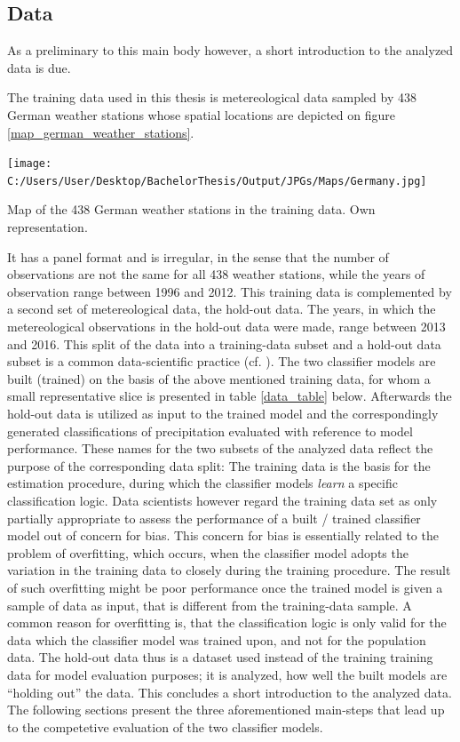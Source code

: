 \documentclass[
  12pt,
]{article}
\begin{document}
\pagebreak

\hypertarget{data}{%
\subsection{Data}\label{data}}

As a preliminary to this main body however, a short introduction to the
analyzed data is due.

The training data used in this thesis is metereological data sampled by
438 German weather stations whose spatial locations are depicted on
figure \ref{map_german_weather_stations}.

\begin{floatingfigure}[r]{7cm}
  \texttt{[image: C:/Users/User/Desktop/BachelorThesis/Output/JPGs/Maps/Germany.jpg]}
  \caption{Map of the 438 German weather stations in the training data. Own representation.}
  \label{map_german_weather_stations}
\end{floatingfigure}

It has a panel format and is irregular, in the sense that the number of
observations are not the same for all 438 weather stations, while the
years of observation range between 1996 and 2012. This training data is
complemented by a second set of metereological data, the hold-out data.
The years, in which the metereological observations in the hold-out data
were made, range between 2013 and 2016. This split of the data into a
training-data subset and a hold-out data subset is a common
data-scientific practice (cf. \citet{Zumel.2014}). The two classifier
models are built (trained) on the basis of the above mentioned training
data, for whom a small representative slice is presented in table
\ref{data_table} below. Afterwards the hold-out data is utilized as
input to the trained model and the correspondingly generated
classifications of precipitation evaluated with reference to model
performance. These names for the two subsets of the analyzed data
reflect the purpose of the corresponding data split: The training data
is the basis for the estimation procedure, during which the classifier
models \textit{learn} a specific classification logic. Data scientists
however regard the training data set as only partially appropriate to
assess the performance of a built / trained classifier model out of
concern for bias. This concern for bias is essentially related to the
problem of overfitting, which occurs, when the classifier model adopts
the variation in the training data to closely during the training
procedure. The result of such overfitting might be poor performance once
the trained model is given a sample of data as input, that is different
from the training-data sample. A common reason for overfitting is, that
the classification logic is only valid for the data which the classifier
model was trained upon, and not for the population data. The hold-out
data thus is a dataset used instead of the training training data for
model evaluation purposes; it is analyzed, how well the built models are
``holding out'' the data. This concludes a short introduction to the
analyzed data. The following sections present the three aforementioned
main-steps that lead up to the competetive evaluation of the two
classifier models.
\end{document}
